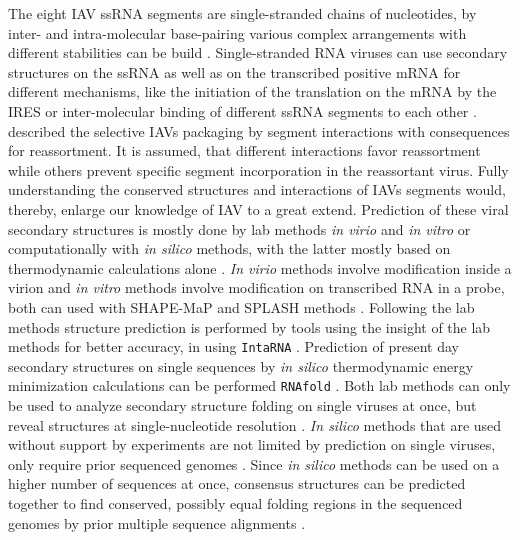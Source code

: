 The eight \gls{IAV} \gls{ssRNA} segments are single-stranded chains of nucleotides, by inter- and intra-molecular base-pairing various complex arrangements with different stabilities can be build \autocite{higgs_rna_2000, dadonaite_structure_2019}. Single-stranded RNA viruses can use secondary structures on the \gls{ssRNA} as well as on the transcribed positive \gls{mRNA} for different mechanisms, like the initiation of the translation on the \gls{mRNA} by the \gls{IRES} or inter-molecular binding of different \gls{ssRNA} segments to each other \autocite{kieft_viral_2008, moss_identification_2011, dadonaite_structure_2019}. \textcite{gerber_selective_2014} described the selective \glspl{IAV} packaging by segment interactions with consequences for reassortment. It is assumed, that different interactions favor reassortment while others prevent specific segment incorporation in the reassortant virus. Fully understanding the conserved structures and interactions of \glspl{IAV} segments would, thereby, enlarge our knowledge of \gls{IAV} to a great extend. Prediction of these viral secondary structures is mostly done by lab methods \textit{in virio} and \textit{in vitro} or computationally with \textit{in silico} methods, with the latter mostly based on thermodynamic calculations alone \autocite{moss_identification_2011, dadonaite_structure_2019}. \textit{In virio} methods involve modification inside a virion and \textit{in vitro} methods involve modification on transcribed RNA in a probe, both can used with SHAPE-MaP and SPLASH methods \autocite{smola_selective_2015, dadonaite_structure_2019}. Following the lab methods structure prediction is performed by tools using the insight of the lab methods for better accuracy, in \textcite{dadonaite_structure_2019} using \texttt{IntaRNA} \autocite{}. Prediction of present day secondary structures on single sequences by \textit{in silico} thermodynamic energy minimization calculations can be performed \texttt{RNAfold} \autocite{}. Both lab methods can only be used to analyze secondary structure folding on single viruses at once, but reveal structures at single-nucleotide resolution \autocite{dadonaite_structure_2019}. \textit{In silico} methods that are used without support by experiments are not limited by prediction on single viruses, only require prior sequenced genomes \autocite{moss_identification_2011, dadonaite_structure_2019}. Since \textit{in silico} methods can be used on a higher number of sequences at once, consensus structures can be predicted together to find conserved, possibly equal folding regions in the sequenced genomes by prior multiple sequence alignments \autocite{moss_identification_2011}. 

